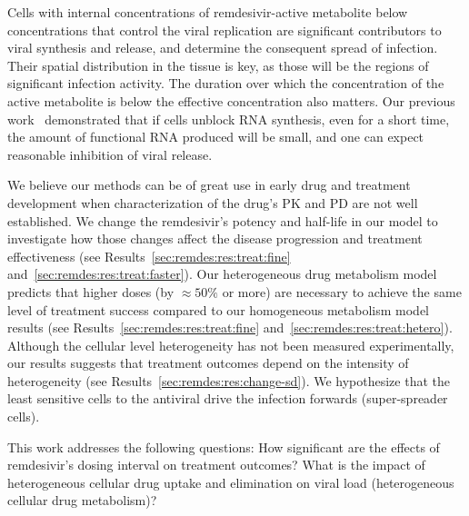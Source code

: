 Cells with internal concentrations of remdesivir-active metabolite below concentrations that control the viral replication are significant contributors to viral synthesis and release, and determine the consequent spread of infection. Their spatial distribution in the tissue is key, as those will be the regions of significant infection activity. The duration over which the concentration of the active metabolite is below the effective concentration also matters. Our previous work~\cite{sego_modular_2020} demonstrated that if cells unblock RNA synthesis, even for a short time, the amount of functional RNA produced will be small, and one can expect reasonable inhibition of viral release.

We believe our methods can be of great use in early drug and treatment development when characterization of the drug's PK and PD are not well established. We change the remdesivir's potency and half-life in our model to investigate how those changes affect the disease progression and treatment effectiveness (see Results~\ref{sec:remdes:res:treat:fine} and~\ref{sec:remdes:res:treat:faster}). Our heterogeneous drug metabolism model predicts that higher doses (by $\approx50\%$ or more) are necessary to achieve the same level of treatment success compared to our homogeneous metabolism model results (see Results~\ref{sec:remdes:res:treat:fine} and~\ref{sec:remdes:res:treat:hetero}). Although the cellular level heterogeneity has not been measured experimentally, our results suggests that treatment outcomes depend on the intensity of heterogeneity (see Results~\ref{sec:remdes:res:change-sd}). We hypothesize that the least sensitive cells to the antiviral drive the infection forwards (super-spreader cells).

This work addresses the following questions: How significant are the effects of remdesivir's dosing interval on treatment outcomes? What is the impact of heterogeneous cellular drug uptake and elimination on viral load (heterogeneous cellular drug metabolism)?
